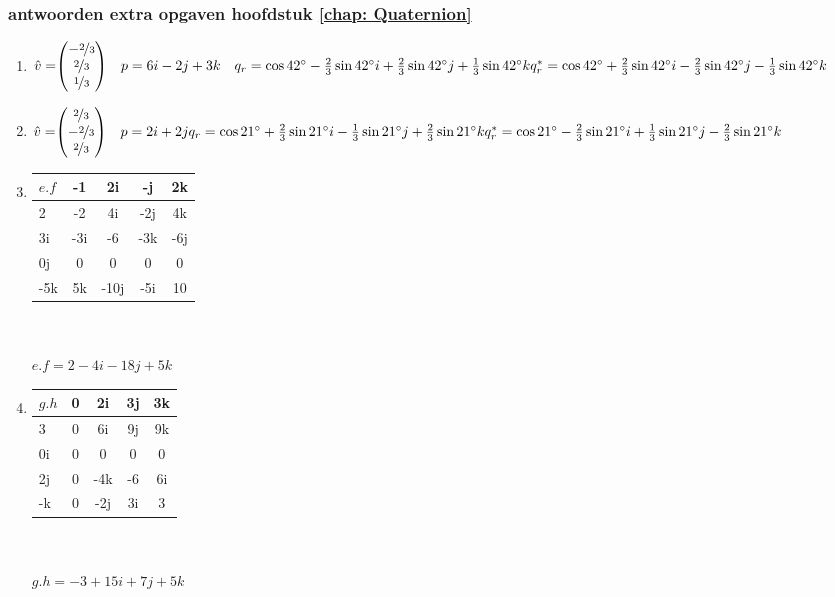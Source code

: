 \documentclass[hidelinks, a4wide, 12pt,  twoside]{book}
\begin{document}
\subsubsection{antwoorden extra opgaven hoofdstuk \ref{chap: Quaternion}}
\begin{enumerate}
	\item 
	$\hat{v} = \vecdrie{-\nicefrac{2}{3}}{\nicefrac{2}{3}}{\nicefrac{1}{3}}
	\quad p  = 6i - 2j + 3k  \\
	\quad q_r  =  \cos 42 \degree  - \frac{2 }{3}\sin 42 \degree i 
	+ \frac{2 }{3}\sin 42 \degree j + \frac{1 }{3}\sin 42 \degree k \\
	q^*_r  =  \cos 42 \degree  + \frac{2 }{3}\sin 42 \degree i 
	- \frac{2 }{3}\sin 42 \degree j - \frac{1 }{3}\sin 42 \degree k $
	
	\item 
	$\hat{v} = \vecdrie{\nicefrac{2}{3}}{- \nicefrac{2}{3}}{\nicefrac{2}{3}}
	\quad p  = 2i + 2j   \\
	q_r  =  \cos 21 \degree  + \frac{2 }{3}\sin 21 \degree i 
	- \frac{1}{3}\sin 21 \degree j
	+ \frac{2 }{3 } \sin 21 \degree k   \\
	q^*_r  =  \cos 21 \degree  - \frac{2 }{3}\sin 21 \degree i 
	+ \frac{1}{3}\sin 21 \degree j
	- \frac{2 }{3 } \sin 21 \degree k $
	
	\item
	\begin{tabular}{ | l || c | c |c |c |}
		\hline
		$ e.f $ &-1 & 2i   & -j & 2k \\ \hline \hline
		2    & -2 & 4i     &  -2j   & 4k  \\ \hline
		3i    & -3i & -6  &  -3k   & -6j  \\ \hline
		0j   & 0 &  0 &   0     & 0\\ \hline
		-5k    & 5k  & -10j   & -5i   & 10\\ 
		\hline 
	\end{tabular} \\ \\
	$ e.f = 2  - 4i -18j + 5k $
	
	\item
	\begin{tabular}{ | l || c | c |c |c |}
		\hline
		$ g.h $ & 0 & 2i  & 3j       & 3k \\ \hline \hline
		3          & 0 & 6i   &   9j    & 9k  \\ \hline
		0i         & 0 & 0   &   0    & 0 \\ \hline
		2j         & 0 &  -4k  &   -6     & 6i\\ \hline
		-k         & 0  & -2j  & 3i      & 3\\ 
		\hline 
	\end{tabular} \\ \\
	$ g.h = -3 +15i + 7j + 5k $
	

\end{enumerate}
\end{document}
